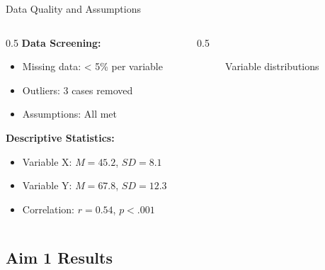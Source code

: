 \documentclass[aspectratio=169,11pt]{beamer}
\begin{document}
\begin{frame}{Data Quality and Assumptions}
  \begin{columns}[T]
    
    \begin{column}{0.5\textwidth}
      \textbf{Data Screening:}
      \begin{itemize}
        \item Missing data: < 5\% per variable
        \item Outliers: 3 cases removed
        \item Assumptions: All met
      \end{itemize}
      
      \vspace{0.3cm}
      
      \textbf{Descriptive Statistics:}
      \begin{itemize}
        \item Variable X: $M = 45.2$, $SD = 8.1$
        \item Variable Y: $M = 67.8$, $SD = 12.3$
        \item Correlation: $r = 0.54$, $p < .001$
      \end{itemize}
    \end{column}
    
    \begin{column}{0.5\textwidth}
      \begin{figure}
        \centering
        \caption{Variable distributions}
      \end{figure}
    \end{column}
    
  \end{columns}
\end{frame}

\subsection{Aim 1 Results}
\end{document}
